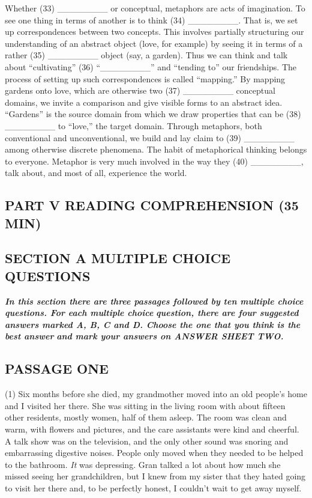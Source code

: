 \documentclass[UTF8,11pt]{ctexart}
\begin{document}
Whether (33) \_\_\_\_\_\_\_\_ or conceptual, metaphors are acts of imagination. To see one thing in terms of another is to think (34) \_\_\_\_\_\_\_\_. That is, we set up correspondences between two concepts. This involves partially structuring our understanding of an abstract object (love, for example) by seeing it in terms of a rather (35) \_\_\_\_\_\_\_\_ object (say, a garden). Thus we can think and talk about “cultivating” (36) “\_\_\_\_\_\_\_\_” and “tending to” our friendships. The process of setting up such correspondences is called “mapping.” By mapping gardens onto love, which are otherwise two (37) \_\_\_\_\_\_\_\_ conceptual domains, we invite a comparison and give visible forms to an abstract idea. “Gardens” is the source domain from which we draw properties that can be (38) \_\_\_\_\_\_\_\_ to “love,” the target domain. Through metaphors, both conventional and unconventional, we build and lay claim to (39) \_\_\_\_\_\_\_\_ among otherwise discrete phenomena. The habit of metaphorical thinking belongs to everyone. Metaphor is very much involved in the way they (40) \_\_\_\_\_\_\_\_, talk about, and most of all, experience the world.


\subsection*{\textbf{PART V READING COMPREHENSION (35 MIN)}}


\subsection*{\textbf{SECTION A MULTIPLE CHOICE QUESTIONS}}


\textbf{\textit{In this section there are three passages followed by ten multiple choice questions. For each multiple choice}} \textbf{\textit{question, there are four suggested answers marked A, B, C and D. Choose the one that you think is the best answer}} \textbf{\textit{and mark your answers on ANSWER SHEET TWO.}}


\subsection*{\textbf{PASSAGE ONE}}


(1) Six months before she died, my grandmother moved into an old people’s home and I visited her there. She was sitting in the living room with about fifteen other residents, mostly women, half of them asleep. The room was clean and warm, with flowers and pictures, and the care assistants were kind and cheerful. A talk show was on the television, and the only other sound was snoring and embarrassing digestive noises. People only moved when they needed to be helped to the bathroom. \textit{It} was depressing. Gran talked a lot about how much she missed seeing her grandchildren, but I knew from my sister that they hated going to visit her there and, to be perfectly honest, I couldn’t wait to get away myself.
\end{document}
